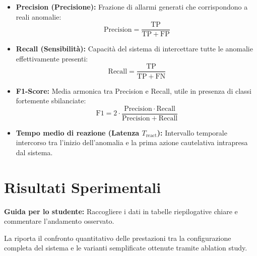 \begin{itemize}
    \item \textbf{Precision (Precisione):} Frazione di allarmi generati che corrispondono a reali anomalie:
    \begin{equation}
    \mathrm{Precision} = \frac{\mathrm{TP}}{\mathrm{TP} + \mathrm{FP}}
    \label{eq:precision}
    \end{equation}
    
    \item \textbf{Recall (Sensibilità):} Capacità del sistema di intercettare tutte le anomalie effettivamente presenti:
    \begin{equation}
    \mathrm{Recall} = \frac{\mathrm{TP}}{\mathrm{TP} + \mathrm{FN}}
    \label{eq:recall}
    \end{equation}
    
    \item \textbf{F1-Score:} Media armonica tra Precision e Recall, utile in presenza di classi fortemente sbilanciate:
    \begin{equation}
    \mathrm{F1} = 2 \cdot \frac{\mathrm{Precision} \cdot \mathrm{Recall}}{\mathrm{Precision} + \mathrm{Recall}}
    \label{eq:f1-score}
    \end{equation}
    
    \item \textbf{Tempo medio di reazione (Latenza $T_{\mathrm{react}}$):} Intervallo temporale intercorso tra l'inizio dell'anomalia e la prima azione cautelativa intrapresa dal sistema.
\end{itemize}


\section{Risultati Sperimentali}
\label{sec:risultati-sperimentali}

\textbf{Guida per lo studente:} Raccogliere i dati in tabelle riepilogative chiare e commentare l'andamento osservato.

La  riporta il confronto quantitativo delle prestazioni tra la configurazione completa del sistema e le varianti semplificate ottenute tramite ablation study.

